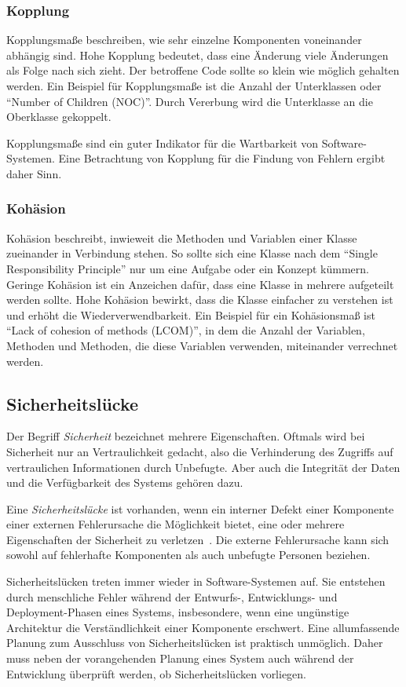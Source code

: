 \subsubsection{Kopplung}
Kopplungsmaße beschreiben, wie sehr einzelne Komponenten voneinander abhängig sind.
Hohe Kopplung bedeutet, dass eine Änderung viele Änderungen als Folge nach sich zieht.
Der betroffene Code sollte so klein wie möglich gehalten werden.
Ein Beispiel für Kopplungsmaße ist die Anzahl der Unterklassen oder "`Number of Children (NOC)"'.
Durch Vererbung wird die Unterklasse an die Oberklasse gekoppelt.

Kopplungsmaße sind ein guter Indikator für die Wartbarkeit von Software-Systemen.
Eine Betrachtung von Kopplung für die Findung von Fehlern ergibt daher Sinn.

\subsubsection{Kohäsion}
Kohäsion beschreibt, inwieweit die Methoden und Variablen einer Klasse zueinander in Verbindung stehen.
So sollte sich eine Klasse nach dem "`Single Responsibility Principle"' nur um eine Aufgabe oder ein Konzept kümmern.
Geringe Kohäsion ist ein Anzeichen dafür, dass eine Klasse in mehrere aufgeteilt werden sollte.
Hohe Kohäsion bewirkt, dass die Klasse einfacher zu verstehen ist und erhöht die Wiederverwendbarkeit.
Ein Beispiel für ein Kohäsionsmaß ist "`Lack of cohesion of methods (LCOM)"', in dem die Anzahl der Variablen, Methoden und Methoden, die diese Variablen verwenden, miteinander verrechnet werden.

\subsection{Sicherheitslücke}
Der Begriff \emph{Sicherheit} bezeichnet mehrere Eigenschaften.
Oftmals wird bei Sicherheit nur an Vertraulichkeit gedacht, also die Verhinderung des Zugriffs auf vertraulichen Informationen durch Unbefugte.
Aber auch die Integrität der Daten und die Verfügbarkeit des Systems gehören dazu.

Eine \emph{Sicherheitslücke} ist vorhanden, wenn ein interner Defekt einer Komponente einer externen Fehlerursache die Möglichkeit bietet, eine oder mehrere Eigenschaften der Sicherheit zu verletzen~\cite{basics}.
Die externe Fehlerursache kann sich sowohl auf fehlerhafte Komponenten als auch unbefugte Personen beziehen.

Sicherheitslücken treten immer wieder in Software-Systemen auf.
Sie entstehen durch menschliche Fehler während der Entwurfs-, Entwicklungs- und Deployment-Phasen eines Systems, insbesondere, wenn eine ungünstige Architektur die Verständlichkeit einer Komponente erschwert.
Eine allumfassende Planung zum Ausschluss von Sicherheitslücken ist praktisch unmöglich.
Daher muss neben der vorangehenden Planung eines System auch während der Entwicklung überprüft werden, ob Sicherheitslücken vorliegen.
